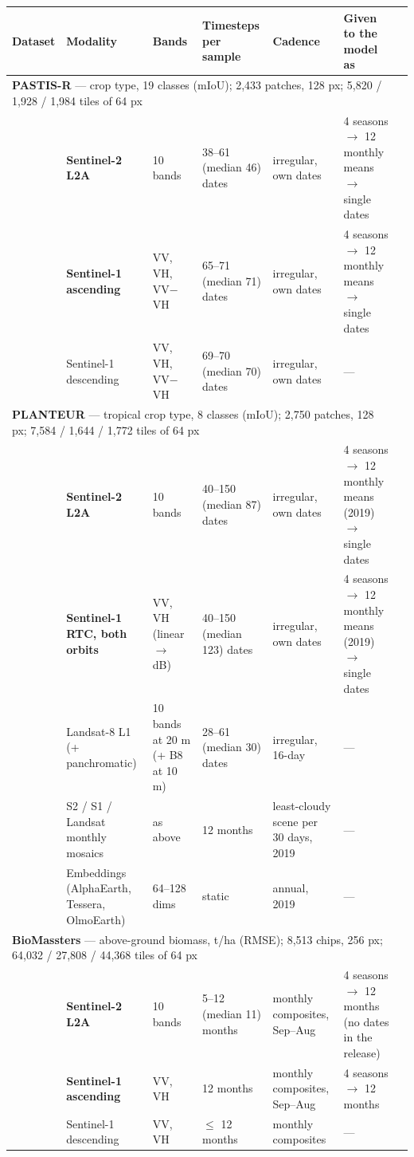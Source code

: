 \begin{tabular}{lllllll}
\toprule
Dataset & Modality & Bands & Timesteps per sample & Cadence & Given to the model as \\
\midrule
\multicolumn{6}{l}{\textbf{PASTIS-R} --- crop type, 19 classes (mIoU); 2,433 patches, 128 px; 5,820 / 1,928 / 1,984 tiles of 64 px} \\
 & \textbf{Sentinel-2 L2A} & 10 bands & 38--61 (median 46) dates & irregular, own dates & 4 seasons $\rightarrow$ 12 monthly means $\rightarrow$ single dates \\
 & \textbf{Sentinel-1 ascending} & VV, VH, VV$-$VH & 65--71 (median 71) dates & irregular, own dates & 4 seasons $\rightarrow$ 12 monthly means $\rightarrow$ single dates \\
 & Sentinel-1 descending & VV, VH, VV$-$VH & 69--70 (median 70) dates & irregular, own dates & --- \\
\midrule
\multicolumn{6}{l}{\textbf{PLANTEUR} --- tropical crop type, 8 classes (mIoU); 2,750 patches, 128 px; 7,584 / 1,644 / 1,772 tiles of 64 px} \\
 & \textbf{Sentinel-2 L2A} & 10 bands & 40--150 (median 87) dates & irregular, own dates & 4 seasons $\rightarrow$ 12 monthly means (2019) $\rightarrow$ single dates \\
 & \textbf{Sentinel-1 RTC, both orbits} & VV, VH (linear $\rightarrow$ dB) & 40--150 (median 123) dates & irregular, own dates & 4 seasons $\rightarrow$ 12 monthly means (2019) $\rightarrow$ single dates \\
 & Landsat-8 L1 (+ panchromatic) & 10 bands at 20 m (+ B8 at 10 m) & 28--61 (median 30) dates & irregular, 16-day & --- \\
 & S2 / S1 / Landsat monthly mosaics & as above & 12 months & least-cloudy scene per 30 days, 2019 & --- \\
 & Embeddings (AlphaEarth, Tessera, OlmoEarth) & 64--128 dims & static & annual, 2019 & --- \\
\midrule
\multicolumn{6}{l}{\textbf{BioMassters} --- above-ground biomass, t/ha (RMSE); 8,513 chips, 256 px; 64,032 / 27,808 / 44,368 tiles of 64 px} \\
 & \textbf{Sentinel-2 L2A} & 10 bands & 5--12 (median 11) months & monthly composites, Sep--Aug & 4 seasons $\rightarrow$ 12 months (no dates in the release) \\
 & \textbf{Sentinel-1 ascending} & VV, VH & 12 months & monthly composites, Sep--Aug & 4 seasons $\rightarrow$ 12 months \\
 & Sentinel-1 descending & VV, VH & $\leq$ 12 months & monthly composites & --- \\

\end{tabular}
